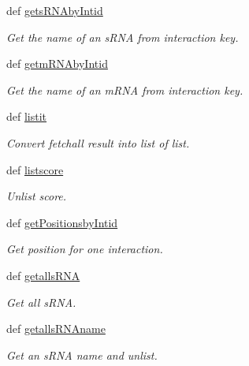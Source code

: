 \begin{DoxyCompactItemize}
def \hyperlink{classirna_1_1iRNA__pred_1_1Sqlite__manager_1_1Sqlite__manager_a40c44e207ad15c15c430d8cb0d50e938}{gets\-R\-N\-Aby\-Intid}
\begin{DoxyCompactList}\small\item\em \-Get the name of an s\-R\-N\-A from interaction key. \end{DoxyCompactList}\item 
def \hyperlink{classirna_1_1iRNA__pred_1_1Sqlite__manager_1_1Sqlite__manager_a500a555058cd9e9158ef11483160cc6e}{getm\-R\-N\-Aby\-Intid}
\begin{DoxyCompactList}\small\item\em \-Get the name of an m\-R\-N\-A from interaction key. \end{DoxyCompactList}\item 
def \hyperlink{classirna_1_1iRNA__pred_1_1Sqlite__manager_1_1Sqlite__manager_a5b5305e80ea802d9aba503ec807b077b}{listit}
\begin{DoxyCompactList}\small\item\em \-Convert fetchall result into list of list. \end{DoxyCompactList}\item 
def \hyperlink{classirna_1_1iRNA__pred_1_1Sqlite__manager_1_1Sqlite__manager_ad27f82c334375719c81effd16623c95a}{listscore}
\begin{DoxyCompactList}\small\item\em \-Unlist score. \end{DoxyCompactList}\item 
def \hyperlink{classirna_1_1iRNA__pred_1_1Sqlite__manager_1_1Sqlite__manager_a3fe31821704f4cead42df8d64a65fccd}{get\-Positionsby\-Intid}
\begin{DoxyCompactList}\small\item\em \-Get position for one interaction. \end{DoxyCompactList}\item 
def \hyperlink{classirna_1_1iRNA__pred_1_1Sqlite__manager_1_1Sqlite__manager_a56d7243e633ecb59b93ecfc577a61f67}{getalls\-R\-N\-A}
\begin{DoxyCompactList}\small\item\em \-Get all s\-R\-N\-A. \end{DoxyCompactList}\item 
def \hyperlink{classirna_1_1iRNA__pred_1_1Sqlite__manager_1_1Sqlite__manager_a160a7d719623d2c4801d66b91f7438af}{getalls\-R\-N\-Aname}
\begin{DoxyCompactList}\small\item\em \-Get an s\-R\-N\-A name and unlist. \end{DoxyCompactList}\item 

\end{DoxyCompactItemize}
